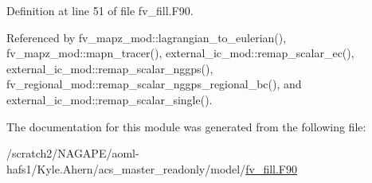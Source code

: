 Definition at line 51 of file fv\-\_\-fill.\-F90.



Referenced by fv\-\_\-mapz\-\_\-mod\-::lagrangian\-\_\-to\-\_\-eulerian(), fv\-\_\-mapz\-\_\-mod\-::mapn\-\_\-tracer(), external\-\_\-ic\-\_\-mod\-::remap\-\_\-scalar\-\_\-ec(), external\-\_\-ic\-\_\-mod\-::remap\-\_\-scalar\-\_\-nggps(), fv\-\_\-regional\-\_\-mod\-::remap\-\_\-scalar\-\_\-nggps\-\_\-regional\-\_\-bc(), and external\-\_\-ic\-\_\-mod\-::remap\-\_\-scalar\-\_\-single().



The documentation for this module was generated from the following file\-:\begin{DoxyCompactItemize}
\item 
/scratch2/\-N\-A\-G\-A\-P\-E/aoml-\/hafs1/\-Kyle.\-Ahern/acs\-\_\-master\-\_\-readonly/model/\hyperlink{fv__fill_8F90}{fv\-\_\-fill.\-F90}\end{DoxyCompactItemize}
